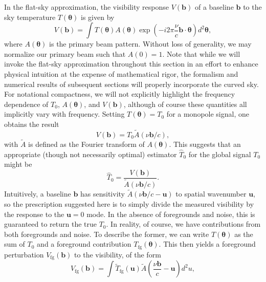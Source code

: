 \documentclass[twolcolumn,apj,iop,numberedappendix]{emulateapj}
\begin{document}
In the flat-sky approximation, the visibility response $V(\mathbf{b})$ of a baseline $\mathbf{b}$ to the sky temperature $T(\boldsymbol \theta)$ is given by
\begin{equation}
\label{eq:Vb}
V(\mathbf{b}) = \int  T(\boldsymbol \theta) A(\boldsymbol \theta) \exp \left( -i 2 \pi \frac{\nu}{c} \mathbf{b} \cdot \boldsymbol \theta \right) d^2 \mathbf{\theta},
\end{equation}
where $ A(\boldsymbol \theta)$ is the primary beam pattern.  Without loss of generality, we may normalize our primary beam such that $A(0) = 1$.  Note that while we will invoke the flat-sky approximation throughout this section in an effort to enhance physical intuition at the expense of mathematical rigor, the formalism and numerical results of subsequent sections will properly incorporate the curved sky. For notational compactness, we will not explicitly highlight the frequency dependence of $T_0$, $A(\mathbf{\theta})$, and $V(\mathbf{b})$, although of course these quantities all implicitly vary with frequency. Setting $T(\boldsymbol \theta) = T_0$ for a monopole signal, one obtains the result
\begin{equation}
\label{eq:blMonoResponse}
V(\mathbf{b}) = T_0 \widetilde{A} \left( \nu \mathbf{b} / c \right),
\end{equation}
with $\widetilde{A}$ is defined as the Fourier transform of $A(\boldsymbol \theta)$.  This suggests that an appropriate (though not necessarily optimal) estimator $\widehat{T}_0$ for the global signal $T_0$ might be
\begin{equation}
\label{eq:singleBlSillyEst}
\widehat{T}_0 = \frac{V( \mathbf{b})}{\widetilde{A} \left( \nu \mathbf{b} / c \right)}.
\end{equation}
Intuitively, a baseline $\mathbf{b}$ has sensitivity $\widetilde{A} \left( \nu \mathbf{b} / c - \mathbf{u} \right)$ to spatial wavenumber $\mathbf{u}$, so the prescription suggested here is to simply divide the measured visibility by the response to the $\mathbf{u}=0$ mode. In the absence of foregrounds and noise, this is guaranteed to return the true $T_0$.  In reality, of course, we have contributions from both foregrounds and noise.  To describe the former, we can write $T(\boldsymbol \theta)$ as the sum of $T_0$ and a foreground contribution $T_\textrm{fg} (\boldsymbol \theta)$.  This then yields a foreground perturbation $V_\textrm{fg} (\mathbf{b})$ to the visibility, of the form
\begin{equation}
V_\textrm{fg} (\mathbf{b}) = \int  \widetilde{T}_\textrm{fg} (\mathbf{u}) \widetilde{A} \left( \frac{\nu \mathbf{b}}{c} - \mathbf{u} \right) d^2 u,
\end{equation}
\end{document}
